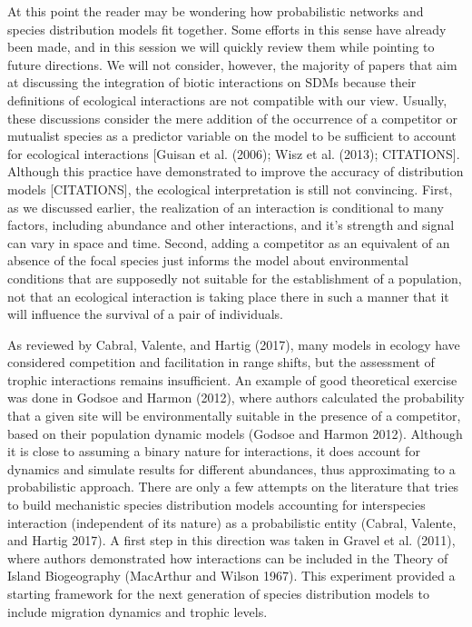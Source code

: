 \documentclass[12pt]{article}
\begin{document}
At this point the reader may be wondering how probabilistic networks and
species distribution models fit together. Some efforts in this sense
have already been made, and in this session we will quickly review them
while pointing to future directions. We will not consider, however, the
majority of papers that aim at discussing the integration of biotic
interactions on SDMs because their definitions of ecological
interactions are not compatible with our view. Usually, these
discussions consider the mere addition of the occurrence of a competitor
or mutualist species as a predictor variable on the model to be
sufficient to account for ecological interactions {[}Guisan et al.
(2006); Wisz et al. (2013); CITATIONS{]}. Although this practice have
demonstrated to improve the accuracy of distribution models
{[}CITATIONS{]}, the ecological interpretation is still not convincing.
First, as we discussed earlier, the realization of an interaction is
conditional to many factors, including abundance and other interactions,
and it's strength and signal can vary in space and time. Second, adding
a competitor as an equivalent of an absence of the focal species just
informs the model about environmental conditions that are supposedly not
suitable for the establishment of a population, not that an ecological
interaction is taking place there in such a manner that it will
influence the survival of a pair of individuals.

As reviewed by Cabral, Valente, and Hartig (2017), many models in
ecology have considered competition and facilitation in range shifts,
but the assessment of trophic interactions remains insufficient. An
example of good theoretical exercise was done in Godsoe and Harmon
(2012), where authors calculated the probability that a given site will
be environmentally suitable in the presence of a competitor, based on
their population dynamic models (Godsoe and Harmon 2012). Although it is
close to assuming a binary nature for interactions, it does account for
dynamics and simulate results for different abundances, thus
approximating to a probabilistic approach. There are only a few attempts
on the literature that tries to build mechanistic species distribution
models accounting for interspecies interaction (independent of its
nature) as a probabilistic entity (Cabral, Valente, and Hartig 2017). A
first step in this direction was taken in Gravel et al. (2011), where
authors demonstrated how interactions can be included in the Theory of
Island Biogeography (MacArthur and Wilson 1967). This experiment
provided a starting framework for the next generation of species
distribution models to include migration dynamics and trophic levels.
\end{document}
